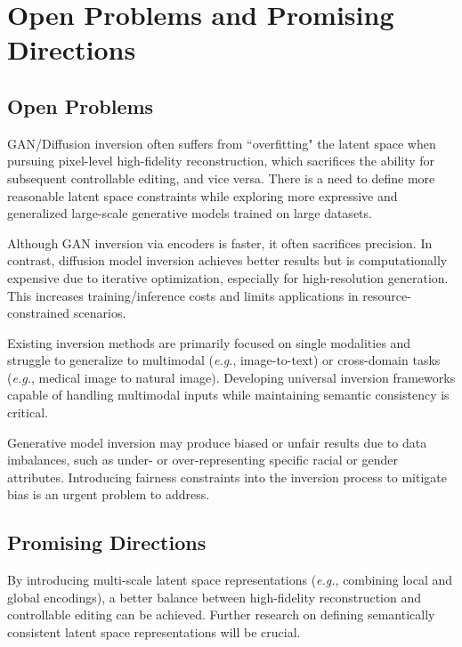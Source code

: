 \section{Open Problems and Promising Directions} \label{sec:experiment}
\subsection{Open Problems}
GAN/Diffusion inversion often suffers from ``overfitting" the latent space when pursuing pixel-level high-fidelity reconstruction, which sacrifices the ability for subsequent controllable editing, and vice versa. There is a need to define more reasonable latent space constraints while exploring more expressive and generalized large-scale generative models trained on large datasets. 

Although GAN inversion via encoders is faster, it often sacrifices precision. In contrast, diffusion model inversion achieves better results but is computationally expensive due to iterative optimization, especially for high-resolution generation. This increases training/inference costs and limits applications in resource-constrained scenarios.

Existing inversion methods are primarily focused on single modalities and struggle to generalize to multimodal (\textit{e.g.}, image-to-text) or cross-domain tasks (\textit{e.g.}, medical image to natural image). Developing universal inversion frameworks capable of handling multimodal inputs while maintaining semantic consistency is critical.

Generative model inversion may produce biased or unfair results due to data imbalances, such as under- or over-representing specific racial or gender attributes. Introducing fairness constraints into the inversion process to mitigate bias is an urgent problem to address.



\subsection{Promising Directions}

By introducing multi-scale latent space representations (\textit{e.g.}, combining local and global encodings), a better balance between high-fidelity reconstruction and controllable editing can be achieved. Further research on defining semantically consistent latent space representations will be crucial.

